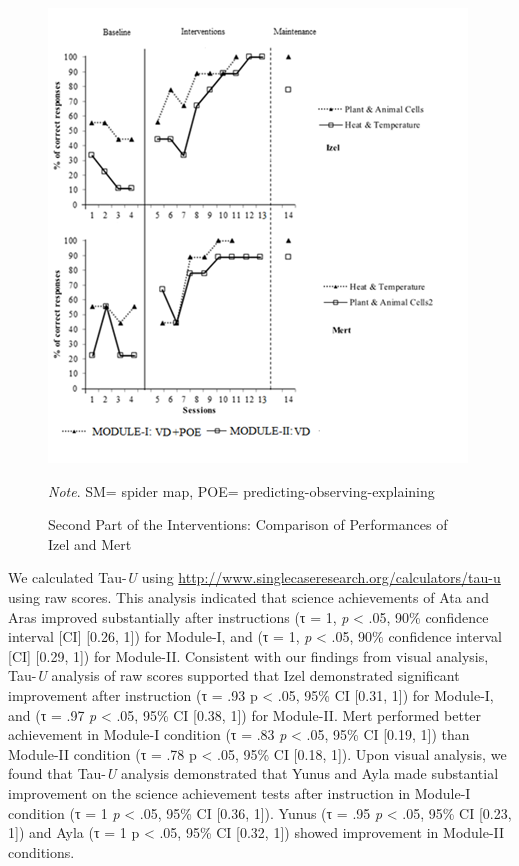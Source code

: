 \documentclass[11.5pt]{sig-alternate} %
\begin{document}
\begin{large}
\begin{figure}[ht]
    \includegraphics[width=1\linewidth]{images/fig3.png}
    \caption{Second Part of the Interventions: Comparison of Performances of Izel and Mert} \vspace{1em}
    \textit{Note}. SM= spider map, POE= predicting-observing-explaining
\end{figure}

We calculated Tau-\textit{U} using \url{http://www.singlecaseresearch.org/calculators/tau-u} using raw scores. This analysis indicated that science achievements of Ata and Aras improved substantially after instructions (τ = 1, \textit{p} < .05, 90\% confidence interval [CI] [0.26, 1]) for Module-I, and (τ = 1, \textit{p} < .05, 90\% confidence interval [CI] [0.29, 1]) for Module-II. Consistent with our findings from visual analysis, Tau-\textit{U} analysis of raw scores supported that Izel demonstrated significant improvement after instruction (τ = .93 p < .05, 95\% CI [0.31, 1]) for Module-I, and (τ = .97 \textit{p} < .05, 95\% CI [0.38, 1]) for Module-II. Mert performed better achievement in Module-I condition (τ = .83 \textit{p} < .05, 95\% CI [0.19, 1]) than Module-II condition (τ = .78 p < .05, 95\% CI [0.18, 1]). Upon visual analysis, we found that Tau-\textit{U} analysis demonstrated that Yunus and Ayla made substantial improvement on the science achievement tests after instruction in Module-I condition (τ = 1 \textit{p} < .05, 95\% CI [0.36, 1]). Yunus (τ = .95 \textit{p} < .05, 95\% CI [0.23, 1]) and Ayla (τ = 1 p < .05, 95\% CI [0.32, 1]) showed improvement in Module-II conditions.


\end{large}
\end{document}
